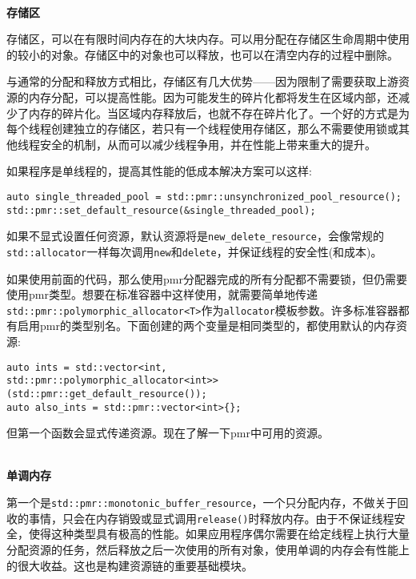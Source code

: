 \hspace*{\fill} \\ %
\noindent
\textbf{存储区}

存储区，可以在有限时间内存在的大块内存。可以用分配在存储区生命周期中使用的较小的对象。存储区中的对象也可以释放，也可以在清空内存的过程中删除。

与通常的分配和释放方式相比，存储区有几大优势——因为限制了需要获取上游资源的内存分配，可以提高性能。因为可能发生的碎片化都将发生在区域内部，还减少了内存的碎片化。当区域内存释放后，也就不存在碎片化了。一个好的方式是为每个线程创建独立的存储区，若只有一个线程使用存储区，那么不需要使用锁或其他线程安全的机制，从而可以减少线程争用，并在性能上带来重大的提升。

如果程序是单线程的，提高其性能的低成本解决方案可以这样:

\begin{lstlisting}[style=styleCXX]
auto single_threaded_pool = std::pmr::unsynchronized_pool_resource();
std::pmr::set_default_resource(&single_threaded_pool);
\end{lstlisting}

如果不显式设置任何资源，默认资源将是\texttt{new\_delete\_resource}，会像常规的\texttt{std::allocator}一样每次调用\texttt{new}和\texttt{delete}，并保证线程的安全性(和成本)。

如果使用前面的代码，那么使用pmr分配器完成的所有分配都不需要锁，但仍需要使用pmr类型。想要在标准容器中这样使用，就需要简单地传递\texttt{std::pmr::polymorphic\_allocator<T>}作为\texttt{allocator}模板参数。许多标准容器都有启用pmr的类型别名。下面创建的两个变量是相同类型的，都使用默认的内存资源:

\begin{lstlisting}[style=styleCXX]
auto ints = std::vector<int,
std::pmr::polymorphic_allocator<int>>(std::pmr::get_default_resource());
auto also_ints = std::pmr::vector<int>{};
\end{lstlisting}

但第一个函数会显式传递资源。现在了解一下pmr中可用的资源。

\hspace*{\fill} \\ %
\noindent
\textbf{单调内存}

第一个是\texttt{std::pmr::monotonic\_buffer\_resource}，一个只分配内存，不做关于回收的事情，只会在内存销毁或显式调用\texttt{release()}时释放内存。由于不保证线程安全，使得这种类型具有极高的性能。如果应用程序偶尔需要在给定线程上执行大量分配资源的任务，然后释放之后一次使用的所有对象，使用单调的内存会有性能上的很大收益。这也是构建资源链的重要基础模块。

